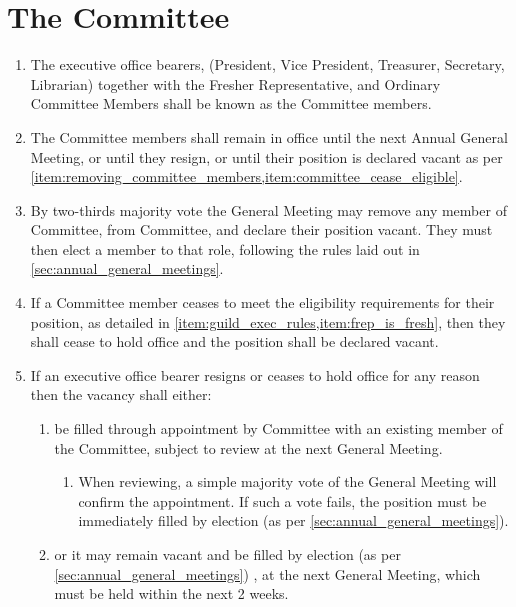 \documentclass[a4paper]{article}
\begin{document}
\section{The Committee} \label{sec:committee}
\begin{enumerate}
    \item The executive office bearers, (President, Vice President, Treasurer, Secretary, Librarian) together with the Fresher Representative, and Ordinary Committee Members shall be known as the Committee members.
    \item The Committee members shall remain in office until the next Annual General Meeting, or until they resign, or until their position is declared vacant as per \cref{item:removing_committee_members,item:committee_cease_eligible}.
    \item \label{item:removing_committee_members} By two-thirds majority vote the General Meeting may remove any member of Committee, from Committee, and declare their position vacant. They must then elect a member to that role, following the rules laid out in \cref{sec:annual_general_meetings}.
    \item \label{item:committee_cease_eligible} If a Committee member ceases to meet the eligibility requirements for their position, as detailed in \cref{item:guild_exec_rules,item:frep_is_fresh}, then they shall cease to hold office and the position shall be declared vacant.
    \item \label{item:exec_vacancy} If an executive office bearer resigns or ceases to hold office for any reason then the vacancy shall either:
          \begin{enumerate}
              \item be filled through appointment by Committee with an existing member of the Committee, subject to review at the next General Meeting.
                    \begin{enumerate}
                        \item When reviewing, a simple majority vote of the General Meeting will confirm the appointment. If such a vote fails, the position must be immediately filled by election (as per \cref{sec:annual_general_meetings}).
                    \end{enumerate}
              \item or it may remain vacant and be filled by election (as per \cref{sec:annual_general_meetings}) , at the next General Meeting, which must be held within the next 2 weeks.
          \end{enumerate}

\end{enumerate}
\end{document}
